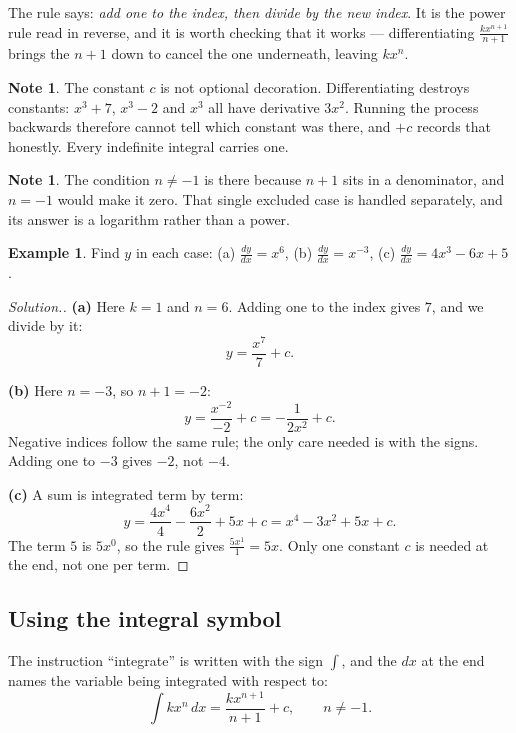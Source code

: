 \documentclass[11pt,a4paper]{article}
\theoremstyle{definition}
\newtheorem{example}[thm]{Example}
\newtheorem{note}[thm]{Note}
\newenvironment{solution}
  {\renewcommand{\qedsymbol}{}\begin{proof}[\textit{Solution}.]}
  {\end{proof}}
\begin{document}
The rule says: \emph{add one to the index, then divide by the new index}. It is the
power rule read in reverse, and it is worth checking that it works --- differentiating
$\frac{kx^{n+1}}{n+1}$ brings the $n+1$ down to cancel the one underneath, leaving
$kx^{n}$.

\begin{note}
The constant $c$ is not optional decoration. Differentiating destroys constants:
$x^3+7$, $x^3-2$ and $x^3$ all have derivative $3x^2$. Running the process backwards
therefore cannot tell which constant was there, and $+c$ records that honestly. Every
indefinite integral carries one.
\end{note}

\begin{note}
The condition $n\neq -1$ is there because $n+1$ sits in a denominator, and $n=-1$ would
make it zero. That single excluded case is handled separately, and its answer is a
logarithm rather than a power.
\end{note}

\begin{example}
Find $y$ in each case: \quad (a) $\frac{dy}{dx}=x^6$, \quad (b) $\frac{dy}{dx}=x^{-3}$,
\quad (c) $\frac{dy}{dx}=4x^3-6x+5$.
\end{example}

\begin{solution}
\textbf{(a)} Here $k=1$ and $n=6$. Adding one to the index gives $7$, and we divide by
it:
$$y=\frac{x^{7}}{7}+c.$$

\textbf{(b)} Here $n=-3$, so $n+1=-2$:
$$y=\frac{x^{-2}}{-2}+c=-\frac{1}{2x^2}+c.$$
Negative indices follow the same rule; the only care needed is with the signs. Adding
one to $-3$ gives $-2$, not $-4$.

\textbf{(c)} A sum is integrated term by term:
$$y=\frac{4x^{4}}{4}-\frac{6x^{2}}{2}+5x+c=x^4-3x^2+5x+c.$$
The term $5$ is $5x^0$, so the rule gives $\frac{5x^1}{1}=5x$. Only one constant $c$ is
needed at the end, not one per term.
\end{solution}

\subsection{Using the integral symbol}

The instruction ``integrate'' is written with the sign $\int$, and the $dx$ at the end
names the variable being integrated with respect to:
$$\int kx^n\,dx=\frac{kx^{n+1}}{n+1}+c,\qquad n\neq -1.$$
\end{document}
